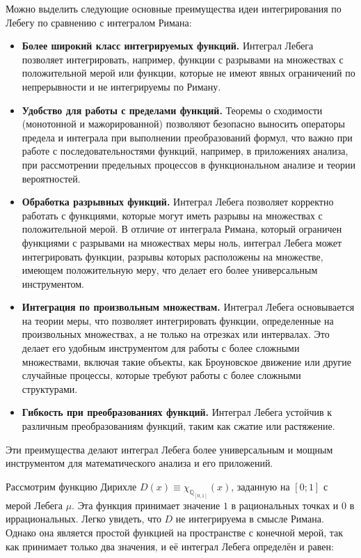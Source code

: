 \documentclass[a4paper,14pt]{extarticle}
\begin{document}
Можно выделить следующие основные преимущества идеи интегрирования по Лебегу по сравнению с интегралом Римана:

\begin{itemize}
    \item \textbf{Более широкий класс интегрируемых функций.} Интеграл Лебега позволяет интегрировать, например, функции с разрывами на множествах с положительной мерой или функции, которые не имеют явных ограничений по непрерывности и не интегрируемы по Риману.
    \item \textbf{Удобство для работы с пределами функций.} Теоремы о сходимости (монотонной и мажорированной) позволяют безопасно выносить операторы предела и интеграла при выполнении преобразований формул, что важно при работе с последовательностями функций, например, в приложениях анализа, при рассмотрении предельных процессов в функциональном анализе и теории вероятностей.
    \item \textbf{Обработка разрывных функций.} Интеграл Лебега позволяет корректно работать с функциями, которые могут иметь разрывы на множествах с положительной мерой. В отличие от интеграла Римана, который ограничен функциями с разрывами на множествах меры ноль, интеграл Лебега может интегрировать функции, разрывы которых расположены на множестве, имеющем положительную меру, что делает его более универсальным инструментом.
    \item \textbf{Интеграция по произвольным множествам.} Интеграл Лебега основывается на теории меры, что позволяет интегрировать функции, определенные на произвольных множествах, а не только на отрезках или интервалах. Это делает его удобным инструментом для работы с более сложными множествами, включая такие объекты, как Броуновское движение или другие случайные процессы, которые требуют работы с более сложными структурами.
    \item \textbf{Гибкость при преобразованиях функций.} Интеграл Лебега устойчив к различным преобразованиям функций, таким как сжатие или растяжение.
\end{itemize}

Эти преимущества делают интеграл Лебега более универсальным и мощным инструментом для математического анализа и его приложений. ~\cite{folland}

Рассмотрим функцию Дирихле $D(x) \equiv \chi_{\mathbb{Q}_{[0,1]}}(x)$, заданную на $[0; 1]$ с мерой Лебега $\mu$. Эта функция принимает значение $1$ в рациональных точках и $0$ в иррациональных. Легко увидеть, что $D$ не интегрируема в смысле Римана. Однако она является простой функцией на пространстве с конечной мерой, так как принимает только два значения, и её интеграл Лебега определён и равен:
\end{document}
